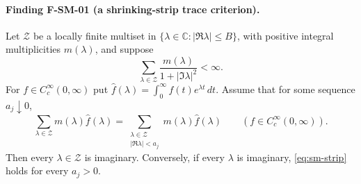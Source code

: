 \paragraph{Finding F-SM-01 (a shrinking-strip trace criterion).}
Let $\mathcal Z$ be a locally finite multiset in
$\{\lambda\in\mathbb C:|\Re\lambda|\leq B\}$, with positive integral
multiplicities $m(\lambda)$, and suppose
\[
 \sum_{\lambda\in\mathcal Z}
       \frac{m(\lambda)}{1+|\Im\lambda|^2}<\infty.
\]
For $f\in C_c^\infty(0,\infty)$ put
$\widehat f(\lambda)=\int_0^\infty f(t)e^{\lambda t}\,dt$.
Assume that for some sequence $a_j\downarrow0$,
\begin{equation}\label{eq:sm-strip}
 \sum_{\lambda\in\mathcal Z}m(\lambda)\widehat f(\lambda)
  =\sum_{\substack{\lambda\in\mathcal Z\\|\Re\lambda|<a_j}}
           m(\lambda)\widehat f(\lambda)
 \qquad(f\in C_c^\infty(0,\infty)).
\end{equation}
Then every $\lambda\in\mathcal Z$ is imaginary.  Conversely, if every
$\lambda$ is imaginary, \eqref{eq:sm-strip} holds for every $a_j>0$.

